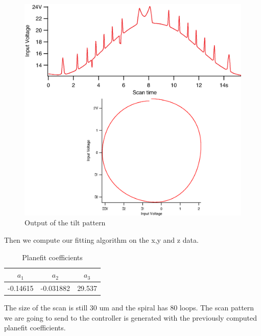\begin{figure}[H]
  \centering
  \includegraphics[scale=0.3]{images/tiltcircles.eps}
    \caption{Output of the tilt pattern}
  \label{tiltcircle}
\end{figure}

Then we compute our fitting algorithm on the x,y and z data.
\begin{table}[H]
\caption{Planefit coefficients} %
\centering %
\begin{tabular}{c c c} %
\hline\hline %
$a_1$ & $a_2$ & $a_3$ \\ [0.5ex] %
\hline %
-0.14615  & -0.031882 & 29.537 \\[1ex]

\hline %
\end{tabular}
\label{table:planefit} %
\end{table}

The size of the scan is still 30 um and the spiral has 80 loops. The scan pattern we are going to send to the controller is generated with the previously computed planefit coefficients. 

